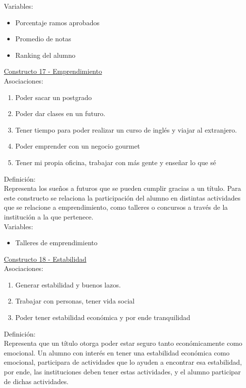 Variables:
\begin{itemize}
	\item Porcentaje ramos aprobados
	\item Promedio de notas
	\item Ranking del alumno	
\end{itemize} 

\underline {Constructo 17 - Emprendimiento} \\
Asociaciones:
\begin{enumerate}
	\item Poder sacar un postgrado
	\item Poder dar clases en un futuro.
	\item Tener tiempo para poder realizar un curso de inglés y viajar al extranjero.
	\item Poder emprender con un negocio gourmet
	\item Tener mi propia oficina, trabajar con más gente y enseñar lo que sé	
\end{enumerate}

Definición:\\
Representa los sueños a futuros que se pueden cumplir gracias a un título. Para este constructo se relaciona la participación del alumno en distintas actividades que se relacione a emprendimiento, como talleres o concursos a través de la institución a la que pertenece.\\

Variables:
\begin{itemize}
	\item Talleres de emprendimiento	
\end{itemize}


\underline {Constructo 18 - Estabilidad} \\
Asociaciones:
\begin{enumerate}
	\item Generar estabilidad y buenos lazos.
	\item Trabajar con personas, tener vida social 	
	\item Poder tener estabilidad económica y por ende tranquilidad
\end{enumerate}

Definición:\\
Representa que un título otorga poder estar seguro tanto económicamente como emocional. Un alumno con interés en tener una estabilidad económica como emocional, participara de actividades que lo ayuden a encontrar esa estabilidad, por ende, las instituciones deben tener estas actividades, y el alumno participar de dichas actividades.\\

